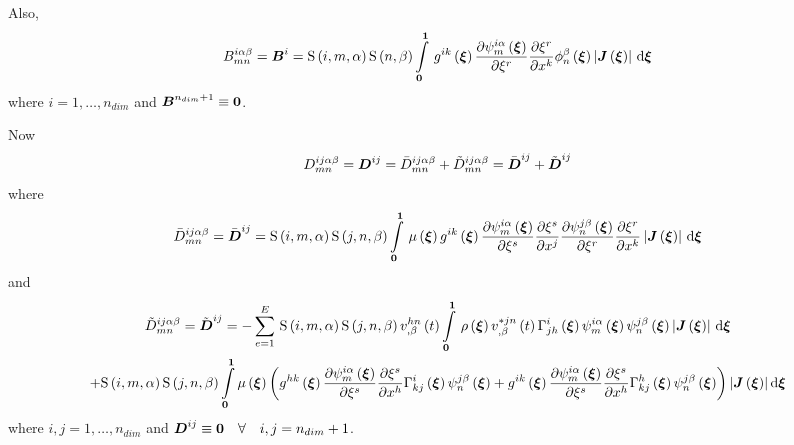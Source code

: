 Also,
\begin{equation}
  B^{i\alpha\beta}_{mn}=\matr{B}^{i}=\idxgsf{i}{m}{\alpha}\gsf{n}{\beta}\gint{\vectr{0}}{\vectr{1}}{
      \fnof{g^{ik}}{\vectr{\xi}}\delby{\idxgbfn{i}{m}{\alpha}{\vectr{\xi}}}{\xi^{r}}\delby{\xi^{r}}{x^{k}}
      \altgbfn{n}{\beta}{\vectr{\xi}}\abs{\fnof{\matr{J}}{\vectr{\xi}}}}{\vectr{\xi}}
\end{equation}
where $i=1,\dots,n_{dim}$ and $\matr{B}^{n_{dim}+1}\equiv\matr{0}$.

Now
\begin{equation}
  D^{ij\alpha\beta}_{mn}=\matr{D}^{ij}=\bar{D}^{ij\alpha\beta}_{mn}+\tilde{D}^{ij\alpha\beta}_{mn}=\bar{\matr{D}}^{ij}+\tilde{\matr{D}}^{ij}
\end{equation}
where
\begin{equation}
  \bar{D}^{ij\alpha\beta}_{mn}=\bar{\matr{D}}^{ij}=\idxgsf{i}{m}{\alpha}\idxgsf{j}{n}{\beta}
  \gint{\vectr{0}}{\vectr{1}}{\fnof{\mu}{\vectr{\xi}}\fnof{g^{ik}}{\vectr{\xi}}\delby{\idxgbfn{i}{m}{\alpha}{\vectr{\xi}}}{\xi^{s}}
    \delby{\xi^{s}}{x^{j}}\delby{\idxgbfn{j}{n}{\beta}{\vectr{\xi}}}{\xi^{r}}\delby{\xi^{r}}{x^{k}}
    \abs{\fnof{\matr{J}}{\vectr{\xi}}}}{\vectr{\xi}}\\
\end{equation}
and
\begin{multline}
  \tilde{D}^{ij\alpha\beta}_{mn}=\tilde{\matr{D}}^{ij}=
  -\gsum{e=1}{E}{\idxgsf{i}{m}{\alpha}\idxgsf{j}{n}{\beta}\fnof{\idxnodedof{v}{h}{n}{\beta}}{t}
    \gint{\vectr{0}}{\vectr{1}}{\fnof{\rho}{\vectr{\xi}}\fnof{\idxnodedof{v}{*j}{n}{\beta}}{t}
      \fnof{\christoffel{i}{j}{h}}{\vectr{\xi}}\idxgbfn{i}{m}{\alpha}{\vectr{\xi}}
      \idxgbfn{j}{n}{\beta}{\vectr{\xi}}\abs{\fnof{\matr{J}}{\vectr{\xi}}}}{\vectr{\xi}}}\\
  +\idxgsf{i}{m}{\alpha}\idxgsf{j}{n}{\beta}
  \dintl{\vectr{0}}{\vectr{1}}\fnof{\mu}{\vectr{\xi}}\pbrac{\fnof{g^{hk}}{\vectr{\xi}}
  \delby{\idxgbfn{i}{m}{\alpha}{\vectr{\xi}}}{\xi^{s}}\delby{\xi^{s}}{x^{h}}
  \fnof{\christoffel{i}{k}{j}}{\vectr{\xi}}\idxgbfn{j}{n}{\beta}{\vectr{\xi}}
  +\fnof{g^{ik}}{\vectr{\xi}}
  \delby{\idxgbfn{i}{m}{\alpha}{\vectr{\xi}}}{\xi^{s}}\delby{\xi^{s}}{x^{h}}
  \fnof{\christoffel{h}{k}{j}}{\vectr{\xi}}\idxgbfn{j}{n}{\beta}{\vectr{\xi}}} 
  \abs{\fnof{\matr{J}}{\vectr{\xi}}}\exteriorderiv{\vectr{\xi}}
\end{multline}
where $i,j=1,\dots,n_{dim}$ and $\matr{D}^{ij}\equiv\matr{0}\quad\forall\quad i,j=n_{dim}+1$.

